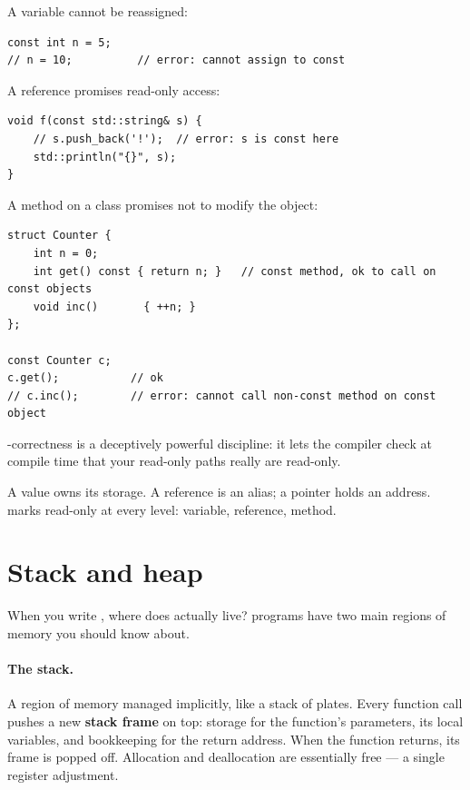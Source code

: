 A  variable cannot be reassigned:

\begin{lstlisting}
const int n = 5;
// n = 10;          // error: cannot assign to const
\end{lstlisting}

A  reference promises read-only access:

\begin{lstlisting}
void f(const std::string& s) {
    // s.push_back('!');  // error: s is const here
    std::println("{}", s);
}
\end{lstlisting}

A  method on a class promises not to modify the object:

\begin{lstlisting}
struct Counter {
    int n = 0;
    int get() const { return n; }   // const method, ok to call on const objects
    void inc()       { ++n; }
};

const Counter c;
c.get();           // ok
// c.inc();        // error: cannot call non-const method on const object
\end{lstlisting}

-correctness is a deceptively powerful discipline: it
lets the compiler check at compile time that your read-only paths
really are read-only.

\begin{recap}
A value owns its storage. A reference is an alias; a pointer holds
an address.  marks read-only at every level: variable,
reference, method.
\end{recap}

\section{Stack and heap}
\label{sec:cpp:stack-heap}

When you write , where does  actually
live? \cpp{} programs have two main regions of memory you should
know about.

\paragraph{The stack.}
A region of memory managed implicitly, like a stack of plates. Every
function call pushes a new \textbf{stack frame} on top: storage for
the function's parameters, its local variables, and bookkeeping for
the return address. When the function returns, its frame is popped
off. Allocation and deallocation are essentially free --- a single
register adjustment.


